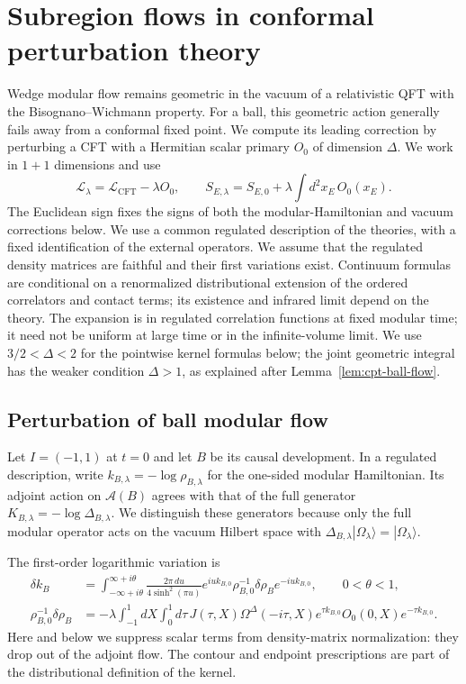 \documentclass[a4paper,11pt]{article}
\theoremstyle{definition}
\begin{document}
\section{Subregion flows in conformal perturbation theory}\label{section:conformalperturbation}

Wedge modular flow remains geometric in the vacuum of a relativistic QFT with the Bisognano--Wichmann property. For a ball, this geometric action generally fails away from a conformal fixed point. We compute its leading correction by perturbing a CFT with a Hermitian scalar primary $O_0$ of dimension $\Delta$. We work in $1+1$ dimensions and use
\begin{equation}
 \mathcal{L}_\lambda=\mathcal{L}_{\mathrm{CFT}}-\lambda O_0,
 \qquad S_{E,\lambda}=S_{E,0}+\lambda\int d^2x_E\,O_0(x_E).
 \label{eq:cpt-deformation}
\end{equation}
The Euclidean sign fixes the signs of both the modular-Hamiltonian and vacuum corrections below. We use a common regulated description of the theories, with a fixed identification of the external operators. We assume that the regulated density matrices are faithful and their first variations exist. Continuum formulas are conditional on a renormalized distributional extension of the ordered correlators and contact terms; its existence and infrared limit depend on the theory. The expansion is in regulated correlation functions at fixed modular time; it need not be uniform at large time or in the infinite-volume limit. We use $3/2<\Delta<2$ for the pointwise kernel formulas below; the joint geometric integral has the weaker condition $\Delta>1$, as explained after Lemma~\ref{lem:cpt-ball-flow}.

\subsection{Perturbation of ball modular flow}

Let $I=(-1,1)$ at $t=0$ and let $B$ be its causal development. In a regulated description, write $k_{B,\lambda}=-\log\rho_{B,\lambda}$ for the one-sided modular Hamiltonian. Its adjoint action on $\mathcal A(B)$ agrees with that of the full generator $K_{B,\lambda}=-\log\Delta_{B,\lambda}$. We distinguish these generators because only the full modular operator acts on the vacuum Hilbert space with $\Delta_{B,\lambda}|\Omega_\lambda\rangle=|\Omega_\lambda\rangle$.

The first-order logarithmic variation is \cite{BalakrishnanParrikar2020}
\begin{align}
 \delta k_B&=\int_{-\infty+i\theta}^{\infty+i\theta}
 \frac{2\pi\,du}{4\sinh^2(\pi u)}
 e^{iu k_{B,0}}\rho_{B,0}^{-1}\delta\rho_B e^{-iu k_{B,0}},
 \qquad 0<\theta<1,\nonumber\\
 \rho_{B,0}^{-1}\delta\rho_B
 &=-\lambda\int_{-1}^1dX\int_0^1d\tau\,
 J(\tau,X)\Omega^\Delta(-i\tau,X)
 e^{\tau k_{B,0}}O_0(0,X)e^{-\tau k_{B,0}}.
 \label{eq:cpt-density-variation}
\end{align}
Here and below we suppress scalar terms from density-matrix normalization: they drop out of the adjoint flow. The contour and endpoint prescriptions are part of the distributional definition of the kernel.
\end{document}
